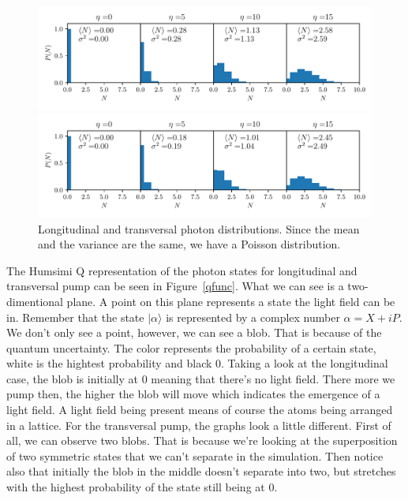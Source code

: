 \begin{figure}[!htb]
	\begin{minipage}[b]{1\linewidth}
	\centering
	\includegraphics[width=1\textwidth]{images/pho_dens_long.pdf}
	\end{minipage}
%
	\begin{minipage}[b]{1\linewidth}
	\centering
	\includegraphics[width=1\textwidth]{images/pho_dens_trans.pdf}
	\end{minipage}
\caption{Longitudinal and transversal photon distributions. Since the mean and the variance are the same, we have a Poisson distribution.}
\label{photon_dist}
\end{figure}
\FloatBarrier

\noindent The Humsimi Q representation of the photon states for longitudinal and transversal pump can be seen in Figure~\ref{qfunc}. What we can see is a two-dimentional plane. A point on this plane represents a state the light field can be in. Remember that the state $| \alpha \rangle$ is represented by a complex number $\alpha = X + iP$. We don't only see a point, however, we can see a blob. That is because of the quantum uncertainty. The color represents the probability of a certain state, white is the hightest probability and black 0. Taking a look at the longitudinal case, the blob is initially at 0 meaning that there's no light field. There more we pump then, the higher the blob will move which indicates the emergence of a light field. A light field being present means of course the atoms being arranged in a lattice. For the transversal pump, the graphs look a little different. First of all, we can observe two blobs. That is because we're looking at the superposition of two symmetric states that we can't separate in the simulation. Then notice also that initially the blob in the middle doesn't separate into two, but stretches with the highest probability of the state still being at 0.


